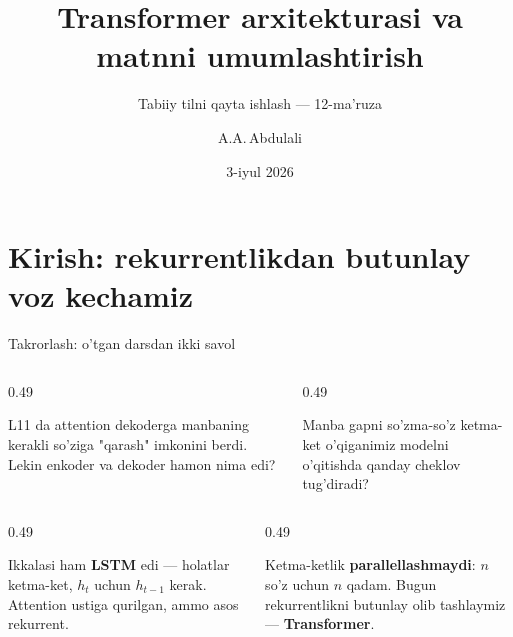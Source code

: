 \documentclass[aspectratio=169,11pt]{beamer}
\title[Transformer]{Transformer arxitekturasi va matnni umumlashtirish}
\subtitle{Tabiiy tilni qayta ishlash --- 12-ma'ruza}
\author[A.A.\,Abdulali]{A.A.\,Abdulali}
\date{3-iyul 2026}
\institute{11:00--12:20 \quad$\cdot$\quad mavzu \textnumero{}12}
\begin{document}

\maketitle

\section[Kirish]{Kirish: rekurrentlikdan butunlay voz kechamiz}

\begin{frame}{Takrorlash: o'tgan darsdan ikki savol}
  \begin{columns}[T]
    \begin{column}{0.49\textwidth}
      \begin{tcolorbox}[warnbox,title=1-savol]
        \small
        L11 da attention dekoderga manbaning kerakli so'ziga "qarash" imkonini
        berdi. Lekin enkoder va dekoder hamon nima edi?
      \end{tcolorbox}
    \end{column}
    \begin{column}{0.49\textwidth}
      \begin{tcolorbox}[warnbox,title=2-savol]
        \small
        Manba gapni so'zma-so'z ketma-ket o'qiganimiz modelni o'qitishda qanday
        cheklov tug'diradi?
      \end{tcolorbox}
    \end{column}
  \end{columns}
  \pause
  \vspace{4pt}
  \begin{columns}[T]
    \begin{column}{0.49\textwidth}
      \begin{tcolorbox}[okbox,title=1-javob]
        \small
        Ikkalasi ham \textbf{LSTM} edi --- holatlar ketma-ket, $h_t$ uchun
        $h_{t-1}$ kerak. Attention ustiga qurilgan, ammo asos rekurrent.
      \end{tcolorbox}
    \end{column}
    \begin{column}{0.49\textwidth}
      \begin{tcolorbox}[okbox,title=2-javob]
        \small
        Ketma-ketlik \textbf{parallellashmaydi}: $n$ so'z uchun $n$ qadam.
        Bugun rekurrentlikni butunlay olib tashlaymiz --- \textbf{Transformer}.
      \end{tcolorbox}
    \end{column}
  \end{columns}
\end{frame}
\end{document}
